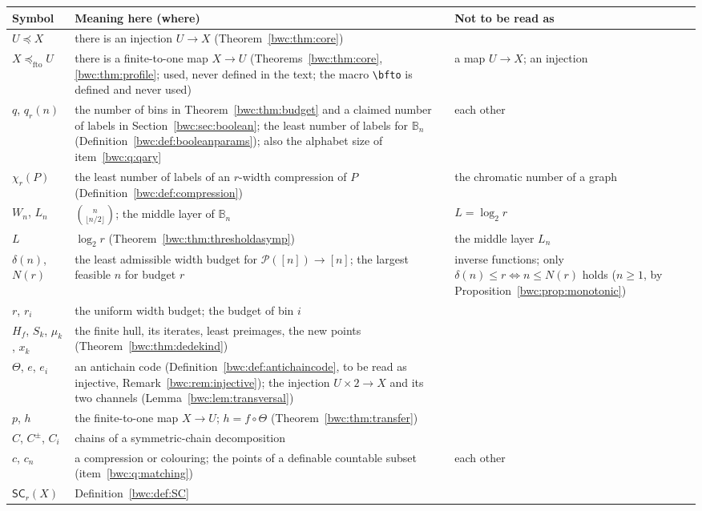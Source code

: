 \documentclass[11pt,letterpaper]{article}
\numberwithin{equation}{section}
\theoremstyle{plain}
\theoremstyle{definition}
\theoremstyle{remark}
\newcommand{\Pow}{\mathcal P}
\newcommand{\B}{\mathbb B}
\newcommand{\SC}{\mathsf{SC}}
\newcommand{\fto}{\preccurlyeq_{\mathrm{fto}}}
\begin{document}
\begin{center}\small
\renewcommand{\arraystretch}{1.12}
\begin{tabularx}{\textwidth}{@{}>{\raggedright\arraybackslash}p{}Y>{\raggedright\arraybackslash}p{0.27\textwidth}@{}}
\toprule
Symbol & Meaning here (where) & Not to be read as\\
\midrule
$U\preccurlyeq X$ & there is an injection $U\to X$
 (Theorem~\ref{bwc:thm:core}) & \\
$X\fto U$ & there is a finite-to-one map $X\to U$
 (Theorems~\ref{bwc:thm:core}, \ref{bwc:thm:profile}; used, never defined in
 the text; the macro \texttt{\textbackslash bfto} is defined and never used)
 & a map $U\to X$; an injection\\
$q$, $q_r(n)$ & the number of bins in Theorem~\ref{bwc:thm:budget} and a
 claimed number of labels in Section~\ref{bwc:sec:boolean}; the least number
 of labels for $\B_n$ (Definition~\ref{bwc:def:booleanparams}); also the
 alphabet size of item~\ref{bwc:q:qary} & each other\\
$\chi_r(P)$ & the least number of labels of an $r$-width compression of $P$
 (Definition~\ref{bwc:def:compression}) & the chromatic number of a graph\\
$W_n$, $L_n$ & $\binom n{\lfloor n/2\rfloor}$; the middle layer of $\B_n$ &
 $L=\log_2r$\\
$L$ & $\log_2 r$ (Theorem~\ref{bwc:thm:thresholdasymp}) & the middle layer
 $L_n$\\
$\delta(n)$, $N(r)$ & the least admissible width budget for $\Pow([n])\to[n]$;
 the largest feasible $n$ for budget $r$ & inverse functions; only
 $\delta(n)\leq r\iff n\leq N(r)$ holds ($n\geq1$, by
 Proposition~\ref{bwc:prop:monotonic})\\
$r$, $r_i$ & the uniform width budget; the budget of bin $i$ & \\
$H_f$, $S_k$, $\mu_k$, $x_k$ & the finite hull, its iterates, least
 preimages, the new points (Theorem~\ref{bwc:thm:dedekind}) & \\
$\Theta$, $e$, $e_i$ & an antichain code (Definition~\ref{bwc:def:antichaincode},
 to be read as injective, Remark~\ref{bwc:rem:injective}); the injection
 $U\times2\to X$ and its two channels (Lemma~\ref{bwc:lem:transversal}) & \\
$p$, $h$ & the finite-to-one map $X\to U$; $h=f\circ\Theta$
 (Theorem~\ref{bwc:thm:transfer}) & \\
$C$, $C^{\pm}$, $C_i$ & chains of a symmetric-chain decomposition & \\
$c$, $c_n$ & a compression or colouring; the points of a definable countable
 subset (item~\ref{bwc:q:matching}) & each other\\
$\SC_r(X)$ & Definition~\ref{bwc:def:SC} & \\
\bottomrule
\end{tabularx}
\end{center}
\end{document}
